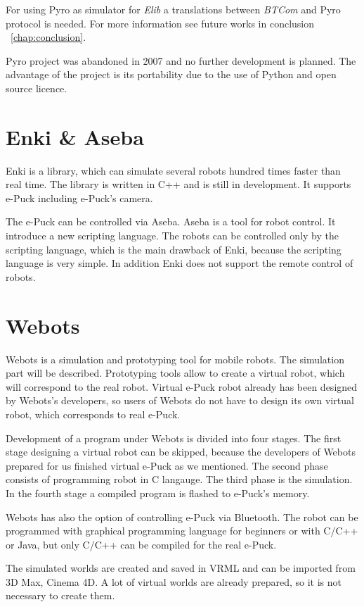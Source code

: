 \documentclass[12pt,notitlepage]{report}
\begin{document}
	For using Pyro as simulator for {\it Elib} a translations between {\it BTCom} and Pyro protocol is needed.
	For more information see future works in conclusion ~\ref{chap:conclusion}.	
	
	Pyro project was abandoned in 2007 and no further development is planned.
	The advantage of the project is its portability due to the use of Python and open source licence.
\section{Enki \& Aseba\cite{enki}}
	Enki is a library, which can simulate several robots hundred times faster than real time.
	The library is written in C++ and is still in development. It supports e-Puck including e-Puck's camera. 
	
	The e-Puck can be controlled via Aseba. Aseba is a tool for robot control.
	It introduce a new scripting language. 
	The robots can be controlled only by the scripting language, which is the main
	drawback of Enki, because the scripting language is very simple.
	In addition Enki does not support the remote control of robots.
\section{Webots\cite{webots}}
	
	Webots is a simulation and prototyping tool for mobile robots.
	The simulation part will be described.  Prototyping tools allow to create a virtual robot,
	which will correspond to the real robot.
	Virtual e-Puck robot already has been designed
	by Webots's developers, so users of Webots do not have to design its own virtual robot, 
	which corresponds to real e-Puck.
	
	Development of a program under Webots is divided into four stages. 
	The first stage designing a virtual robot can be skipped,
	because the developers of Webots prepared for us finished virtual e-Puck as we mentioned.
	The second phase consists of programming robot in C langauge. 
	The third phase is the simulation. In the fourth stage a compiled program is flashed to e-Puck's memory.
	
	Webots has also the option of controlling e-Puck via Bluetooth.
	The robot can be programmed with graphical programming language for beginners or with C/C++ or Java,
	but only C/C++ can be compiled for the real e-Puck.
	
	The simulated worlds are created and saved in VRML and can be imported 
	from 3D Max, Cinema 4D.
	A lot of virtual worlds are already prepared, so it is not necessary to create them.
	
\end{document}
